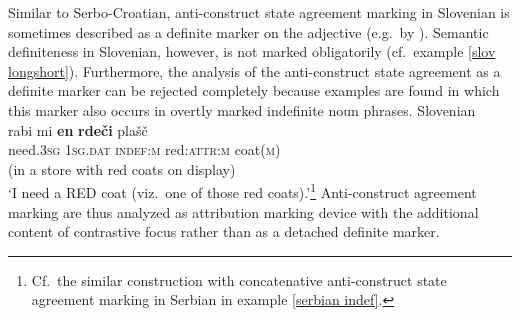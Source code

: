 Similar to Serbo-Croatian, anti\hyp{}construct state agreement marking in Slovenian is sometimes described as a definite marker on the adjective (e.g.~by \citealt[411]{priestly1993}). Semantic definiteness in Slovenian, however, is not marked obligatorily (cf.~example \ref{slov longshort}). Furthermore, the analysis of the anti\hyp{}construct state agreement as a definite marker can be rejected completely because examples are found in which this marker also occurs in overtly marked indefinite noun phrases.
\ea
\rm{Slovenian \citep{marusic-etal2007}}\\
\gll 	rabi mi \textbf{en} \textbf{rde\v{c}i} pla\v{s}\v{c}\\
	need.\textsc{3sg} \textsc{1sg.dat} \textsc{indef:m} red:\textsc{attr:m} coat(\textsc{m})\\
\glt (in a store with red coats on display)\\‘I need a RED coat (viz.~one of those red coats).’\footnote{Cf.~the similar construction with concatenative anti\hyp{}construct state agreement marking in Serbian in example \ref{serbian indef}.}
\z
Anti\hyp{}construct agreement marking are thus analyzed as attribution marking device with the additional content of contrastive focus rather than as a detached definite marker.

